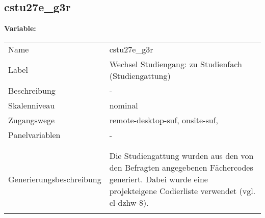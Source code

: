 	
	
	\subsection{cstu27e\_g3r}
	\label{subSection:cstu27e_g3r}

	\noindent\textbf{Variable:}\\
		\begin{tabular}{lL{11.3cm}}
			\label{tableVariable:cstu27e_g3r}
			Name & cstu27e\_g3r \\
			Label & Wechsel Studiengang: zu Studienfach (Studiengattung) \\
			Beschreibung & - \\
			Skalenniveau & nominal \\
			Zugangswege &
				remote-desktop-suf,
				onsite-suf,
 \\
			Panelvariablen & -
			 \\
			 \\
 \\
					Generierungsbeschreibung & Die Studiengattung wurden aus den von den Befragten angegebenen Fächercodes generiert.  Dabei wurde eine projekteigene Codierliste verwendet (vgl. cl-dzhw-8).
				 \\	
			 \\
		\end{tabular}






